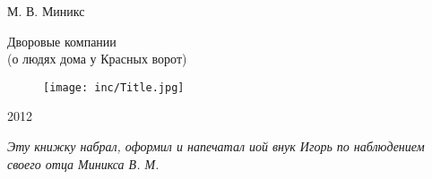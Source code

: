 \thispagestyle{empty} 

\begin{center}
М. В. Миникс

\vfill

\large Дворовые компании \\(о людях дома у Красных ворот)

\vfill

\begin{figure}[ht]
  \centering
  \texttt{[image: inc/Title.jpg]}
\end{figure}

\vfill

2012

\end{center}

\newpage

\thispagestyle{empty} 




\textit{Эту книжку набрал, оформил и напечатал иой внук Игорь  по наблюдением своего отца Миникса В. М.}



\newpage
\restoregeometry
